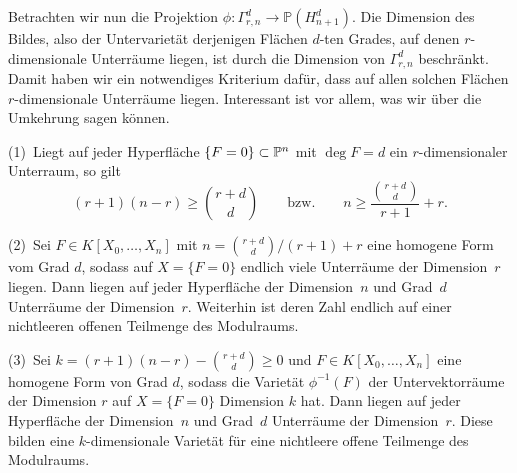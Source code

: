 Betrachten wir nun die Projektion $\phi \colon \Gamma_{r,n}^d \to \mathbb P(H_{n+1}^d)$. Die Dimension des Bildes, also der Untervarietät derjenigen Flächen $d$-ten Grades, auf denen $r$-dimensionale Unterräume liegen, ist durch die Dimension von $\Gamma_{r,n}^d$ beschränkt. Damit haben wir ein notwendiges Kriterium dafür, dass auf allen solchen Flächen $r$-dimensionale Unterräume liegen. Interessant ist vor allem, was wir über die Umkehrung sagen können.

\begin{theorem}
(1)~Liegt auf jeder Hyperfläche $\{F = 0\} \subset \mathbb P^{n}$ mit $\deg F = d$ ein $r$-dimensionaler Unterraum, so gilt
\begin{equation}
(r+1)(n-r) \geq \binom{r+d}d \qquad\text{bzw.}\qquad n \geq \frac{\binom{r+d}d}{r+1} + r.
\end{equation}

(2)~Sei $F \in K[X_0, \dots, X_n]$ mit $n = \binom{r+d}d / (r+1) + r$ eine homogene Form vom Grad $d$, sodass auf $X = \{F = 0\}$ endlich viele Unterräume der Dimension~$r$ liegen. Dann liegen auf jeder Hyperfläche der Dimension~$n$ und Grad~$d$ Unterräume der Dimension~$r$. Weiterhin ist deren Zahl endlich auf einer nichtleeren offenen Teilmenge des Modulraums.

(3)~Sei $k = (r+1)(n-r) - \binom{r+d}d \geq 0$ und $F \in K[X_0, \dots, X_n]$ eine homogene Form von Grad $d$, sodass die Varietät $\phi^{-1}(F)$ der Untervektorräume der Dimension $r$ auf $X = \{F = 0\}$ Dimension $k$ hat. Dann liegen auf jeder Hyperfläche der Dimension~$n$ und Grad~$d$ Unterräume der Dimension~$r$. Diese bilden eine $k$-dimensionale Varietät für eine nichtleere offene Teilmenge des Modulraums.
\end{theorem}
